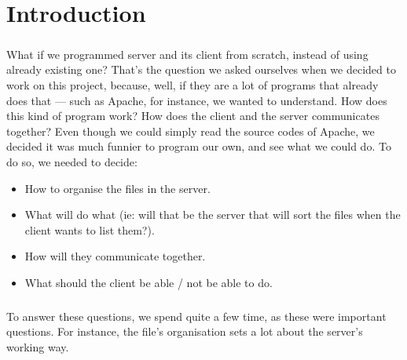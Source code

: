 \documentclass[12pt,a4paper,twoside]{article}
\begin{document}
	\maketitle{}
	\tableofcontents{}
	\newpage{}
	\section{Introduction} %
		\subparagraph*{}
			What if we programmed server and its client from scratch, instead of using already existing one? That's the question we asked ourselves when we decided to work on this project, because, well, if they are a lot of programs	that already does that — such as Apache, for instance, we wanted to understand. How does this kind of program work? How does the client and the server communicates together? Even though we could simply read the source codes of Apache, we decided it was much funnier to program our own, and see what we could do. To do so, we needed to decide:
			\begin{itemize}
				\item{} How to organise the files in the server.
				\item{} What will do what (ie: will that be the server that will sort the files when the client wants to list them?).
				\item{} How will they communicate together.
				\item{} What should the client be able / not be able to do.
			\end{itemize}
		\subparagraph*{}
			To answer these questions, we spend quite a few time, as these were important questions. For instance, the file's organisation sets a lot about the server's working way.
\end{document}
